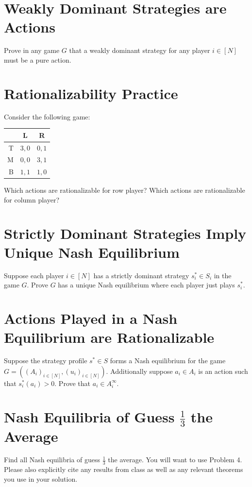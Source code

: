 \documentclass[11pt]{article}
\title{}
\date{}
\theoremstyle{definition}
\theoremstyle{plain}
\begin{document}
\section{Weakly Dominant Strategies are Actions}
Prove in any game $G$ that a weakly dominant strategy for any player $i \in [N]$ must be a pure action. 

\section{Rationalizability Practice}

Consider the following game:

\begin{center}
\begin{tabular}{r|c|c|}
  & L & R  \\\hline
T & $3, 0$ & $0, 1$ \\\hline
M & $0, 0$ & $3, 1$ \\\hline
B & $1, 1$ & $1, 0$ \\\hline
\end{tabular}
\end{center}
Which actions are rationalizable for row player? Which actions are rationalizable for column player? 

\section{Strictly Dominant Strategies Imply Unique Nash Equilibrium} 
Suppose each player $i \in [N]$ has a strictly dominant strategy $s^*_i \in S_i$ in the game $G$. Prove $G$ has a unique Nash equilibrium where each player just plays $s^*_i$.



\section{Actions Played in a Nash Equilibrium are Rationalizable}
Suppose  the strategy profile $s^* \in S$ forms a Nash equilibrium for the game $G=((A_i)_{i \in [N]},(u_i)_{i \in [N]})$. Additionally suppose $a_i \in A_i$ is an action such that $s^*_i(a_i)>0$. Prove that $a_i \in A^{\infty}_i$.

\section{Nash Equilibria of Guess $\frac{1}{3}$ the Average}
Find all Nash equilibria of guess $\frac{1}{3}$ the average. You will want to use Problem 4. Please also explicitly cite any results from class as well as any relevant theorems you use in your solution.
\end{document}
